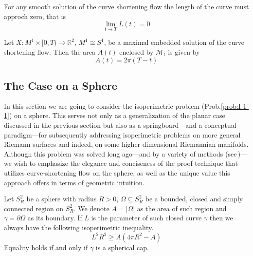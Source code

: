 \newpage
\begin{lemma}\label{lem:I-1-7}
    For any smooth solution of the curve shortening flow the length of the curve must approch zero, that is
    \begin{equation}
        \lim_{t\to T}L(t)=0
    \end{equation}
\end{lemma}

\begin{lemma}\label{lem:I-1-8}
    Let $X:M^1\times[0,T)\to\mathbb{R}^2$, $M^1\cong S^1$, be a maximal embedded solution of the curve shortening flow. Then the area $A(t)$ enclosed by $\mathcal{M}_t$ is given by
    \begin{equation}
        A(t)=2\pi (T-t)
    \end{equation}
\end{lemma}

\subsection{The Case on a Sphere}

In this section we are going to consider the isoperimetric problem (Prob.\ref{prob:I-1-1}) on a sphere. This serves not only as a generalization of the planar case discussed in the previous section but also as a springboard—and a conceptual paradigm—for subsequently addressing isoperimetric problems on more general Riemann surfaces and indeed, on some higher dimensional Riemannian manifolds. Although this problem was solved long ago—and by a variety of methods (see\,\cite{martinez2021isoperimetric})—we wish to emphasize the elegance and conciseness of the proof technique that utilizes curve-shortening flow on the sphere, as well as the unique value this approach offers in terms of geometric intuition.

\begin{theorem}\label{thm:S-Isoperimetric Inequality}
    Let $S^2_R$ be a sphere with radius $R>0$, $\Omega\subseteq S^2_R$ be a bounded, closed and simply connected region on $S^2_R$. We denote $A=\left|\Omega\right|$ as the area of such region and $\gamma=\partial\Omega$ as its boundary. If $L$ is the parameter of such closed curve $\gamma$ then we always have the following isoperimetric inequality.
    \begin{equation}\label{eq:S-IsoInequlity}
        L^2 R^2\ge A\left(4\pi R^2-A\right)
    \end{equation}
    Equality holds if and only if $\gamma$ is a spherical cap.
\end{theorem}

